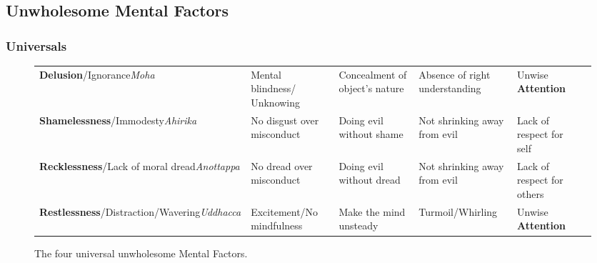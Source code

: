 
\pagebreak
\subsection*{Unwholesome Mental Factors}

\subsubsection*{Universals}

\begin{figure} [H]

\setlength{\tabcolsep}{0pt}
\renewcommand{\arraystretch}{1.1}

\begin{tabular}{P{0.25\textwidth} | C{.185\textwidth} C{0.185\textwidth} C{0.185\textwidth} C{0.195\textwidth} m{0mm}}
\toprule
 &  &  &  & \\
\midrule
\textbf{Delusion}/\newline Ignorance\newline \textit{Moha} & Mental blindness/ Unknowing & Concealment of object’s nature & Absence of right understanding & Unwise \textbf{Attention} &\\[12mm]
\textbf{Shamelessness}/\newline Immodesty\newline \textit{Ahirika} & No disgust over misconduct & Doing evil without shame & Not shrinking away from evil & Lack of respect for self &\\[12mm]
\textbf{Recklessness}/\newline Lack of moral dread\newline \textit{Anottappa} & No dread over misconduct & Doing evil without dread & Not shrinking away from evil & Lack of respect for others &\\[12mm]
\textbf{Restlessness}/\newline Distraction/Wavering\newline \textit{Uddhacca} & Excitement/\newline No mindfulness & Make the mind unsteady & Turmoil/\newline Whirling & Unwise \textbf{Attention} &\\[12mm]
\bottomrule
\end{tabular}

\caption{The four universal unwholesome Mental Factors.}

\end{figure}

